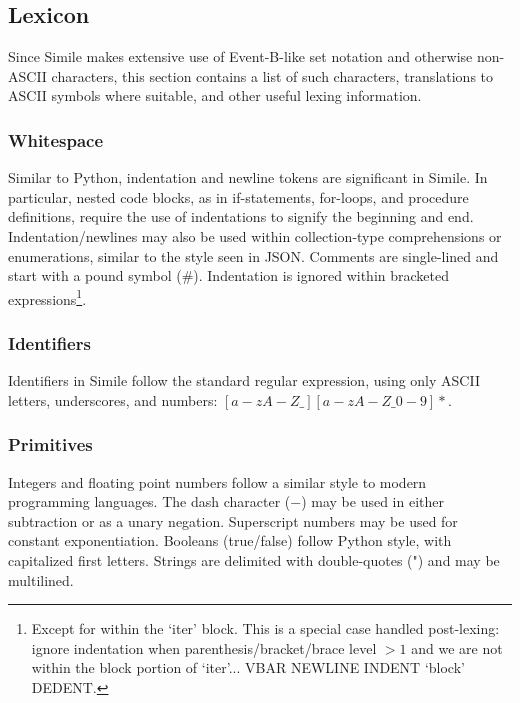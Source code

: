 
\subsection{Lexicon}
Since Simile makes extensive use of Event-B-like set notation and otherwise non-ASCII characters, this section contains a list of such characters, translations to ASCII symbols where suitable, and other useful lexing information.

\subsubsection{Whitespace}
Similar to Python, indentation and newline tokens are significant in Simile. In particular, nested code blocks, as in if-statements, for-loops, and procedure definitions, require the use of indentations to signify the beginning and end. Indentation/newlines may also be used within collection-type comprehensions or enumerations, similar to the style seen in JSON. Comments are single-lined and start with a pound symbol (\#). Indentation is ignored within bracketed expressions\footnote{Except for within the `iter' block. This is a special case handled post-lexing: ignore indentation when parenthesis/bracket/brace level $>1$ and we are not within the block portion of `iter'... VBAR NEWLINE INDENT `block' DEDENT.}.

\subsubsection{Identifiers}
Identifiers in Simile follow the standard regular expression, using only ASCII letters, underscores, and numbers: $[a-zA-Z\_][a-zA-Z\_0-9]*$.

\subsubsection{Primitives}
Integers and floating point numbers follow a similar style to modern programming languages. The dash character ($-$) may be used in either subtraction or as a unary negation. Superscript numbers may be used for constant exponentiation. Booleans (true/false) follow Python style, with capitalized first letters. Strings are delimited with double-quotes (") and may be multilined.


